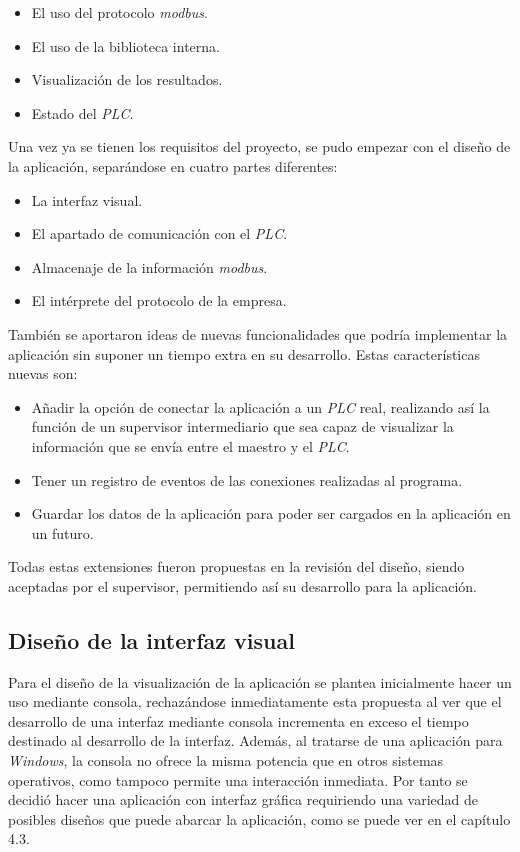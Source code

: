 \documentclass[pdftex,11pt,a4paper]{book}
\begin{document}
\begin{itemize}
\item El uso del protocolo \emph{modbus}.
\item El uso de la biblioteca interna.
\item Visualización de los resultados.
\item Estado del \emph{PLC}.
\end{itemize}

Una vez ya se tienen los requisitos del proyecto, se pudo empezar con el diseño de la aplicación, separándose en cuatro partes diferentes:

\begin{itemize}
\item La interfaz visual.
\item El apartado de comunicación con el \emph{PLC}.
\item Almacenaje de la información \emph{modbus}.
\item El intérprete del protocolo de la empresa.
\end{itemize}

También se aportaron ideas de nuevas funcionalidades que podría implementar la aplicación sin suponer un tiempo extra en su desarrollo. Estas características nuevas son:

\begin{itemize}
\item Añadir la opción de conectar la aplicación a un \emph{PLC} real, realizando así la función de un supervisor intermediario que sea capaz de visualizar la información que se envía entre el maestro y el \emph{PLC}.
\item Tener un registro de eventos de las conexiones realizadas al programa.
\item Guardar los datos de la aplicación para poder ser cargados en la aplicación en un futuro.
\end{itemize}

Todas estas extensiones fueron propuestas en la revisión del diseño, siendo aceptadas por el supervisor, permitiendo así su desarrollo para la aplicación.

\subsection{Diseño de la interfaz visual}

Para el diseño de la visualización de la aplicación se plantea inicialmente hacer un uso mediante consola, rechazándose inmediatamente esta propuesta al ver que el desarrollo de una interfaz mediante consola incrementa en exceso el tiempo destinado al desarrollo de la interfaz. Además, al tratarse de una aplicación para \emph{Windows}, la consola no ofrece la misma potencia que en otros sistemas operativos, como tampoco permite una interacción inmediata. Por tanto se decidió hacer una aplicación con interfaz gráfica requiriendo una variedad de posibles diseños que puede abarcar la aplicación, como se puede ver en el capítulo 4.3.
\end{document}
